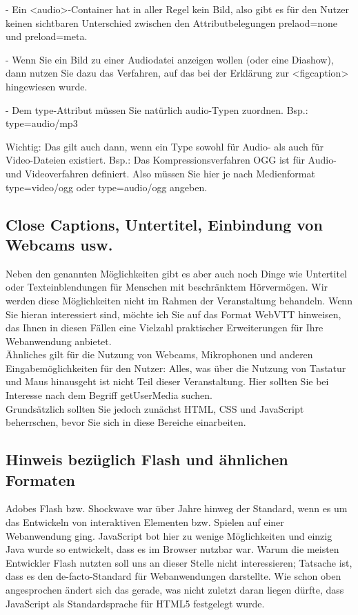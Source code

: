-	Ein <audio>-Container hat in aller Regel kein Bild, also gibt es für den Nutzer keinen sichtbaren Unterschied zwischen den Attributbelegungen prelaod=none und preload=meta.

-	Wenn Sie ein Bild zu einer Audiodatei anzeigen wollen (oder eine Diashow), dann nutzen Sie dazu das Verfahren, auf das bei der Erklärung zur <figcaption> hingewiesen wurde.

-	Dem type-Attribut müssen Sie natürlich audio-Typen zuordnen.
Bsp.: type=audio/mp3

Wichtig: Das gilt auch dann, wenn ein Type sowohl für Audio- als auch für Video-Dateien existiert. Bsp.: Das Kompressionsverfahren OGG ist für Audio- und Videoverfahren definiert. Also müssen Sie hier je nach Medienformat type=video/ogg oder type=audio/ogg angeben.

\subsection{Close Captions, Untertitel, Einbindung von Webcams usw.}

Neben den genannten Möglichkeiten gibt es aber auch noch Dinge wie Untertitel oder Texteinblendungen für Menschen mit beschränktem Hörvermögen. Wir werden diese Möglichkeiten nicht im Rahmen der Veranstaltung behandeln. Wenn Sie hieran interessiert sind, möchte ich Sie auf das Format WebVTT hinweisen, das Ihnen in diesen Fällen eine Vielzahl praktischer Erweiterungen für Ihre Webanwendung anbietet.\\

Ähnliches gilt für die Nutzung von Webcams, Mikrophonen und anderen Eingabemöglichkeiten für den Nutzer: Alles, was über die Nutzung von Tastatur und Maus hinausgeht ist nicht Teil dieser Veranstaltung. Hier sollten Sie bei Interesse nach dem Begriff getUserMedia suchen.\\

Grundsätzlich sollten Sie jedoch zunächst HTML, CSS und JavaScript beherrschen, bevor Sie sich in diese Bereiche einarbeiten.

\subsection{Hinweis bezüglich Flash und ähnlichen Formaten}

Adobes Flash bzw. Shockwave war über Jahre hinweg der Standard, wenn es um das Entwickeln von interaktiven Elementen bzw. Spielen auf einer Webanwendung ging. JavaScript bot hier zu wenige Möglichkeiten und einzig Java wurde so entwickelt, dass es im Browser nutzbar war. Warum die meisten Entwickler Flash nutzten soll uns an dieser Stelle nicht interessieren; Tatsache ist, dass es den de-facto-Standard für Webanwendungen darstellte. Wie schon oben angesprochen ändert sich das gerade, was nicht zuletzt daran liegen dürfte, dass JavaScript als Standardsprache für HTML5 festgelegt wurde. \\

